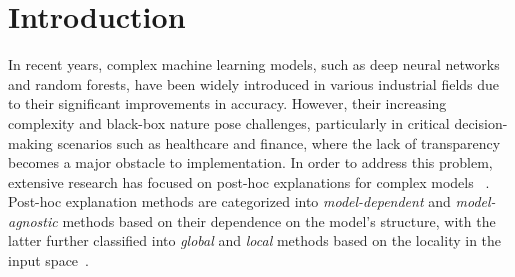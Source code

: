 \documentclass[runningheads]{llncs}
\begin{document}
\section{Introduction}
In recent years,
complex machine learning models, such as deep neural networks and random forests,
have been widely introduced in various industrial fields
due to their significant improvements in accuracy.
However,
their increasing complexity and black-box nature pose challenges,
particularly in critical decision-making scenarios such as healthcare and finance,
where the lack of transparency becomes a major obstacle to implementation.
In order to address this problem,
extensive research has focused on post-hoc explanations for complex models
~\cite{guidotti2018local,ribeiro2016why,ribeiro2018anchors}.
Post-hoc explanation methods are categorized
into \emph{model-dependent} and \emph{model-agnostic} methods
based on their dependence on the model's structure,
with the latter further classified into \emph{global} and \emph{local} methods
based on the locality in the input space~\cite{samek2021explaining}.
\end{document}
